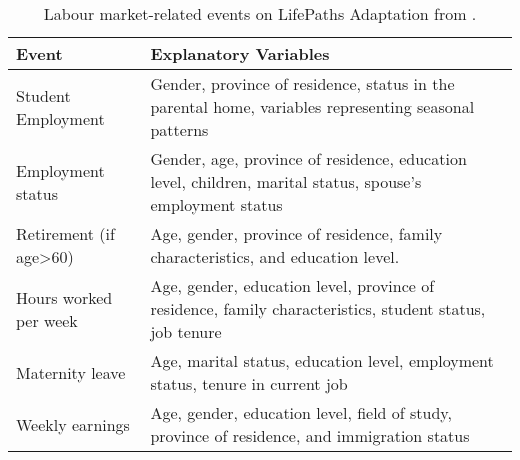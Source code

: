 \renewcommand{\arraystretch}{1.5}
\begin{table}[!h]
    \begin{tabular}{p{4cm}p{10cm}}
        \textbf{Event} & \textbf{Explanatory Variables} \\
        \hline
        \rowcolor{lightgray} Student Employment & Gender, province of residence, status in the parental home, variables representing seasonal patterns \\

        Employment status & Gender, age, province of residence, education level, children, marital status, spouse's employment status \\

        \rowcolor{lightgray} Retirement \newline (if age>60) & Age, gender, province of residence, family characteristics, and education level. \\ 

        Hours worked per week & Age, gender, education level, province of residence, family characteristics, student status, job tenure\\

        \rowcolor{lightgray} Maternity leave & Age, marital status, education level, employment status, tenure in current job \\

        Weekly earnings & Age, gender, education level, field of study, province of residence, and immigration status \\
        \hline
    \end{tabular}
    \caption{\label{table:lifepaths} Labour market-related events on LifePaths Adaptation from \citep{StatsCAN2013}.}
\end{table}





